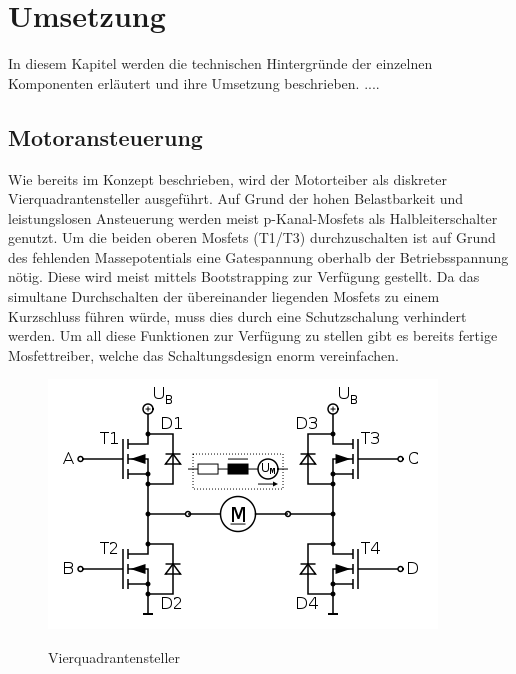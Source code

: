\chapter{Umsetzung}

In diesem Kapitel werden die technischen Hintergründe der einzelnen Komponenten erläutert und ihre Umsetzung beschrieben.
....


\section{Motoransteuerung}
Wie bereits im Konzept beschrieben, wird der Motorteiber als diskreter Vierquadrantensteller ausgeführt. Auf Grund der hohen Belastbarkeit
und leistungslosen Ansteuerung werden meist p-Kanal-Mosfets als Halbleiterschalter genutzt. Um die beiden oberen Mosfets (T1/T3) durchzuschalten
ist auf Grund des fehlenden Massepotentials eine Gatespannung oberhalb der Betriebsspannung nötig. Diese wird meist mittels Bootstrapping zur
Verfügung gestellt. Da das simultane Durchschalten der übereinander liegenden Mosfets zu einem Kurzschluss führen würde, muss dies durch
eine Schutzschalung verhindert werden. Um all diese Funktionen zur Verfügung zu stellen gibt es bereits fertige Mosfettreiber,
welche das Schaltungsdesign enorm vereinfachen.

\begin{figure}[H]
\centering
\includegraphics[width=.8\textwidth]{Vierquadrantensteller.png}\\
\caption{Vierquadrantensteller \cite{vierquadrantensteller}}%
\label{fig:Vierquadrantensteller}
\end{figure}


